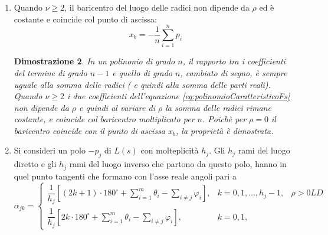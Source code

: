 \documentclass[a4paper]{report}
\newtheorem{dimostrazione}{Dimostrazione}
\begin{document}
\begin{enumerate}
  dispari di singolarit\`a di $L(s)$. Fanno parte del luogo inverso,
  tutti i punti a sinistra di un numero pari di singolarit\`a di
  $L(s)$.
  \begin{dimostrazione}
    Preso un generico punto $s$ sull'asse reale, per ogni
    singolarit\`a reale alla sua sinistra e ogni coppia di
    singolarit\`a complesse, produce un contributo a
    \[
    arg N(s) - arg D(s)
    \]
    nullo o pari a $\pm 360^{\circ}$. Invece per ogni
    singolarit\`a alla sua destra d\`a un contributo di $\pm
    180^{\circ}$. Affinch\`e la somma dei vari termini sia pari ad un
    multiplo dispari (o pari) di $180^{\circ}$, il punto deve essere a
    sinistra di un numero dispari (o pari) di singolarit\`a.
  \end{dimostrazione}
\item Quando $\nu \geq 2$, il baricentro del luogo delle radici non
  dipende da $\rho$ ed \`e costante e coincide col punto di ascissa:
  \begin{equation}\label{eq:xb}
    x_b = - \dfrac{1}{n} \sum_{i = 1}^{n} p_i
  \end{equation}
  \begin{dimostrazione}
    In un polinonio di grado $n$, il rapporto tra i coefficienti del
    termine di grado $n - 1$ e quello di grado $n$, cambiato di segno,
    \`e sempre uguale alla somma delle radici ( e quindi alla somma
    delle parti reali). Quando $\nu \geq 2$ i due coefficienti
    dell'equazione \ref{eq:polinomioCaratteristicoFs} non dipende da
    $\rho$ e quindi al variare di $\rho$ la somma delle radici rimane
    costante, e coincide col baricentro moltiplicato per $n$. Poich\`e
    per $\rho = 0$ il baricentro coincide con il punto di ascissa
    $x_b$, la propriet\`a \`e dimostrata.
  \end{dimostrazione}
\item Si consideri un polo $-p_j$ di $L(s)$ con molteplicit\`a
  $h_j$. Gli $h_j$ rami del luogo diretto e gli $h_j$ rami del luogo
  inverso che partono da questo polo, hanno in quel punto tangenti che
  formano con l'asse reale angoli pari a
  \[
  \alpha_{jk} =
  \left \{
  \begin{array}{lll}
    \dfrac{1}{h_j} \left[ (2k + 1) \cdot 180^{\circ} + \sum\limits_{i =
        1}^{m} \theta_i - \sum\limits_{i \neq j} \varphi_i \right], & k=0, 1,
    ..., h_j - 1, & \rho > 0 LD\\
    \dfrac{1}{h_j} \left[ 2k \cdot 180^{\circ} + \sum\limits_{i =
        1}^{m} \theta_i - \sum\limits_{i \neq j} \varphi_i \right], & k=0, 1,

\end{array}\]
\end{enumerate}
\end{document}
